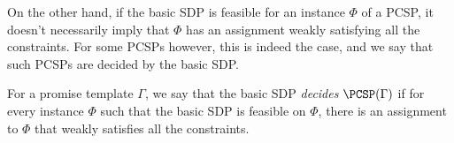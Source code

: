On the other hand, if the basic SDP is feasible for an instance $\Phi$ of a PCSP, it doesn't necessarily imply that $\Phi$ has an assignment weakly satisfying all the constraints. For some PCSPs however, this is indeed the case, and we say that such PCSPs are decided by the basic SDP.

\begin{definition}
{For a promise template $\Gamma$, w}e say that the basic SDP \textit{decides} {$\PCSP(\Gamma)$} if for every instance $\Phi$ such that the basic SDP is feasible on $\Phi$, there is an assignment to $\Phi$ that weakly satisfies all the constraints. 
\end{definition}
